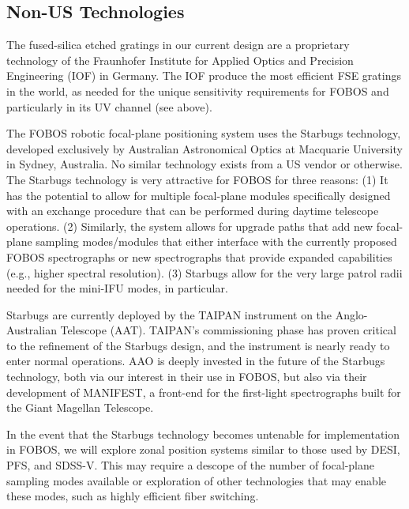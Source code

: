 \documentclass[oneside,11pt]{amsart}
\begin{document}

\subsection{Non-US Technologies}
\label{sec:starbugs}

The fused-silica etched gratings in our current design are a
proprietary technology of the Fraunhofer Institute for Applied Optics
and Precision Engineering (IOF) in Germany. The IOF produce the most
efficient FSE gratings in the world, as needed for the unique
sensitivity requirements for FOBOS and particularly in its UV channel
(see above).

The FOBOS robotic focal-plane positioning system uses the Starbugs
technology, developed exclusively by Australian Astronomical Optics
at Macquarie University in Sydney, Australia. No similar technology
exists from a US vendor or otherwise. The Starbugs technology is very
attractive for FOBOS for three reasons: (1) It has the potential to
allow for multiple focal-plane modules specifically designed with an
exchange procedure that can be performed during daytime telescope
operations. (2) Similarly, the system allows for upgrade paths that
add new focal-plane sampling modes/modules that either interface with
the currently proposed FOBOS spectrographs or new spectrographs that
provide expanded capabilities (e.g., higher spectral resolution). (3)
Starbugs allow for the very large patrol radii needed for the
mini-IFU modes, in particular.

Starbugs are currently deployed by the TAIPAN instrument on the
Anglo-Australian Telescope (AAT). TAIPAN's commissioning phase has
proven critical to the refinement of the Starbugs design, and the
instrument is nearly ready to enter normal operations. AAO is deeply
invested in the future of the Starbugs technology, both via our
interest in their use in FOBOS, but also via their development of
MANIFEST, a front-end for the first-light spectrographs built for the
Giant Magellan Telescope.

In the event that the Starbugs technology becomes untenable for
implementation in FOBOS, we will explore zonal position systems
similar to those used by DESI, PFS, and SDSS-V. This may require a
descope of the number of focal-plane sampling modes available or
exploration of other technologies that may enable these modes, such
as highly efficient fiber switching.
\end{document}
